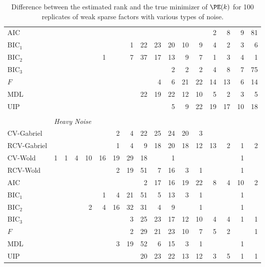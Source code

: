 \begin{table}
\begin{tabular}{lrrrrrrrrrrrrrrrr}
 AIC &  &  &  &  &  &  &  &  &  &  &  &  &  2 &  8 &  9 &  81\\ 
 BIC$_1$ &  &  &  &  &  &  &  1 &  22 &  23 &  20 &  10 &  9 &  4 &  2 &  3 &  6\\ 
 BIC$_2$ &  &  &  &  &  1 &  &  7 &  37 &  17 &  13 &  9 &  7 &  1 &  3 &  4 &  1\\ 
 BIC$_3$ &  &  &  &  &  &  &  &  &  &  2 &  2 &  2 &  4 &  8 &  7 &  75\\ 
 $F$ &  &  &  &  &  &  &  &  &  4 &  6 &  21 &  22 &  14 &  13 &  6 &  14\\ 
 MDL &  &  &  &  &  &  &  &  22 &  19 &  22 &  12 &  10 &  5 &  2 &  3 &  5\\ 
 UIP &  &  &  &  &  &  &  &  &  &  5 &  9 &  22 &  19 &  17 &  10 &  18\\ 
        \\
        &\multicolumn{16}{l}{\scriptsize{\textit{Heavy Noise}}} \\
CV-Gabriel &  &  &  &  &  &  2 &  4 &  22 &  25 &  24 &  20 &  3 &  &  &  & \\ 
 RCV-Gabriel &  &  &  &  &  &  1 &  4 &  9 &  18 &  20 &  18 &  12 &  13 &  2 &  1 &  2\\ 
 CV-Wold &  1 &  1 &  4 &  10 &  16 &  19 &  29 &  18 &  &  1 &  &  &  &  &  1 & \\ 
 RCV-Wold &  &  &  &  &  &  2 &  19 &  51 &  7 &  16 &  3 &  1 &  &  &  1 & \\ 
 AIC &  &  &  &  &  &  &  &  2 &  17 &  16 &  19 &  22 &  8 &  4 &  10 &  2\\ 
 BIC$_1$ &  &  &  &  &  1 &  4 &  21 &  51 &  5 &  13 &  3 &  1 &  &  &  1 & \\ 
 BIC$_2$ &  &  &  &  2 &  4 &  16 &  32 &  31 &  4 &  9 &  &  1 &  &  &  1 & \\ 
 BIC$_3$ &  &  &  &  &  &  &  3 &  25 &  23 &  17 &  12 &  10 &  4 &  4 &  1 &  1\\ 
 $F$ &  &  &  &  &  &  &  2 &  29 &  21 &  23 &  10 &  7 &  5 &  2 &  &  1\\ 
 MDL &  &  &  &  &  &  3 &  19 &  52 &  6 &  15 &  3 &  1 &  &  &  1 & \\ 
 UIP &  &  &  &  &  &  &  &  20 &  23 &  22 &  13 &  12 &  3 &  5 &  1 &  1\\ 
        \bottomrule
    \end{tabular}
    \caption{
        Difference between the estimated rank and the true minimizer of 
        $\PE(k)$ for 100 replicates of weak sparse factors with various
        types of noise.
    }
\end{table}


